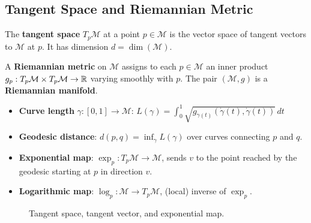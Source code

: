 \subsection{Tangent Space and Riemannian Metric}

\begin{definition}
The \textbf{tangent space} $T_p\mathcal{M}$ at a point $p \in \mathcal{M}$
is the vector space of tangent vectors to $\mathcal{M}$ at $p$. It has
dimension $d = \dim(\mathcal{M})$.
\end{definition}

\begin{definition}
A \textbf{Riemannian metric} on $\mathcal{M}$ assigns to each
$p \in \mathcal{M}$ an inner product
$g_p: T_p\mathcal{M} \times T_p\mathcal{M} \to \mathbb{R}$ varying smoothly with $p$.
The pair $(\mathcal{M}, g)$ is a \textbf{Riemannian manifold}.
\end{definition}

\begin{keyformulas}[title=\textbf{Basic objects in Riemannian geometry}]
\begin{itemize}
    \item \textbf{Curve length} $\gamma: [0,1] \to \mathcal{M}$:
          $L(\gamma) = \int_0^1 \sqrt{g_{\gamma(t)}(\dot{\gamma}(t), \dot{\gamma}(t))}\, dt$
    \item \textbf{Geodesic distance}:
          $d(p, q) = \inf_\gamma L(\gamma)$ over curves connecting $p$ and $q$.
    \item \textbf{Exponential map}:
          $\exp_p: T_p\mathcal{M} \to \mathcal{M}$, sends $v$ to the point
          reached by the geodesic starting at $p$ in direction $v$.
    \item \textbf{Logarithmic map}:
          $\log_p: \mathcal{M} \to T_p\mathcal{M}$, (local) inverse of $\exp_p$.
\end{itemize}
\end{keyformulas}

\begin{figure}[htbp]
\centering
{}
\caption{Tangent space, tangent vector, and exponential map.}
\end{figure}

